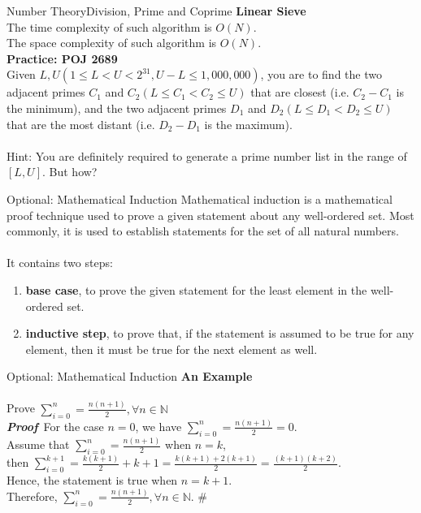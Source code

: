 \documentclass[10pt]{beamer}
\begin{document}
\begin{frame}{Number Theory}{Division, Prime and Coprime}
\textbf{\large Linear Sieve} \\
The time complexity of such algorithm is $O(N)$. \\
The space complexity of such algorithm is $O(N)$. \\[0.5cm]
\pause
\textbf{Practice: POJ 2689} \\
Given $L, U(1\leq L < U < 2^{31}, U-L\leq 1,000,000)$, you are to find the two adjacent primes $C_1$ and $C_2 (L\leq C_1 < C_2 \leq U)$ that are closest (i.e. $C_2 - C_1$ is the minimum), and the two adjacent primes $D_1$ and $D_2 (L\leq D_1 < D_2 \leq U)$ that are the most distant (i.e. $D_2 - D_1$ is the maximum). 
\\~\\
\pause
Hint: You are definitely required to generate a prime number list in the range of $[L,U]$. But how?
\end{frame}


\begin{frame}{Optional: Mathematical Induction}
Mathematical induction is a mathematical proof technique used to prove a given statement about any well-ordered set. Most commonly, it is used to establish statements for the set of all natural numbers. \\~\\
\pause
It contains two steps:
\begin{enumerate}
\item \textbf{base case}, to prove the given statement for the least element in the well-ordered set. \pause
\item \textbf{inductive step}, to prove that, if the statement is assumed to be true for any element, then it must be true for the next element as well.
\end{enumerate}
\end{frame}

\begin{frame}{Optional: Mathematical Induction}
\textbf{\large An Example}
\\~\\
Prove $\sum_{i=0}^n = \frac{n(n+1)}{2}, \forall n\in \mathbb{N}$ \\[0.5cm]
\pause
\textbf{\sl Proof}~For the case $n=0$, we have $\sum_{i=0}^n=\frac{n(n+1)}{2}=0$. \\[0.2cm]
\pause
Assume that $\sum_{i=0}^n=\frac{n(n+1)}{2}$ when $n=k$, \\[0.2cm]
then $\sum_{i=0}^{k+1}=\frac{k(k+1)}{2}+k+1=\frac{k(k+1)+2(k+1)}{2}=\frac{(k+1)(k+2)}{2}$. \\[0.2cm]
Hence, the statement is true when $n=k+1$. \\[0.2cm]
\pause
Therefore, $\sum_{i=0}^n = \frac{n(n+1)}{2}, \forall n\in \mathbb{N}$. \#
\end{frame}
\end{document}
